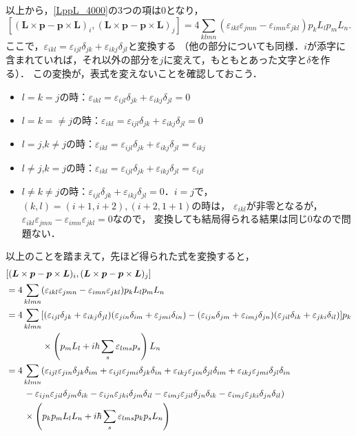 以上から，\eqref{LppL_4000}の3つの項は$0$となり，
\[[(\boldsymbol{L}\times\boldsymbol{p} - \boldsymbol{p}\times\boldsymbol{L})_i,(\boldsymbol{L}\times\boldsymbol{p} - \boldsymbol{p}\times\boldsymbol{L})_j]=4\sum_{klmn}(\varepsilon_{ikl}\varepsilon_{jmn} - \varepsilon_{imn}\varepsilon_{jkl})p_kL_lp_mL_n.\]
ここで，$\varepsilon_{ikl}=\varepsilon_{ijl}\delta_{jk} + \varepsilon_{ikj}\delta_{jl}$と変換する
（他の部分についても同様．$i$が添字に含まれていれば，それ以外の部分を$j$に変えて，もともとあった文字と$\delta$を作る）．
この変換が，表式を変えないことを確認しておこう．
\begin{itemize}
  \item $l=k=j$の時：$\varepsilon_{ikl}=\varepsilon_{ijl}\delta_{jk} + \varepsilon_{ikj}\delta_{jl}=0$
  \item $l=k=\neq j$の時：$\varepsilon_{ikl}=\varepsilon_{ijl}\delta_{jk} + \varepsilon_{ikj}\delta_{jl}=0$
  \item $l=j$,$k\neq j$の時：$\varepsilon_{ikl}=\varepsilon_{ijl}\delta_{jk} + \varepsilon_{ikj}\delta_{jl}=\varepsilon_{ikj}$
  \item $l\neq j$,$k=j$の時：$\varepsilon_{ikl}=\varepsilon_{ijl}\delta_{jk} + \varepsilon_{ikj}\delta_{jl}=\varepsilon_{ijl}$
  \item $l\neq k\neq j$の時：$\varepsilon_{ijl}\delta_{jk} + \varepsilon_{ikj}\delta_{jl}=0$．$i=j$で，$(k,l)=(i + 1,i + 2),(i + 2,1 + 1)$の時は，
  $\varepsilon_{ikl}$が非零となるが，$\varepsilon_{ikl}\varepsilon_{jmn} - \varepsilon_{imn}\varepsilon_{jkl}=0$なので，
  変換しても結局得られる結果は同じ$0$なので問題ない．
\end{itemize}
以上のことを踏まえて，先ほど得られた式を変換すると，
\begin{align}
  & [(\boldsymbol{L}\times\boldsymbol{p} - \boldsymbol{p}\times\boldsymbol{L})_i,(\boldsymbol{L}\times\boldsymbol{p} - \boldsymbol{p}\times\boldsymbol{L})_j] \\
  & = 4\sum_{klmn}(\varepsilon_{ikl}\varepsilon_{jmn} - \varepsilon_{imn}\varepsilon_{jkl})p_kL_lp_mL_n\notag\\
  & = 4\sum_{klmn}[(\varepsilon_{ijl}\delta_{jk} + \varepsilon_{ikj}\delta_{jl})(\varepsilon_{jin}\delta_{im} + \varepsilon_{jmi}\delta_{in}) - (\varepsilon_{ijn}\delta_{jm} + \varepsilon_{imj}\delta_{jn})(\varepsilon_{jil}\delta_{ik} + \varepsilon_{jki}\delta_{il})]p_k \\
  & \qquad \qquad \times \left(p_mL_l + i\hbar\sum_s\varepsilon_{lms}p_s\right)L_n\notag\\
  & = 4\sum_{klmn}(\varepsilon_{ijl}\varepsilon_{jin}\delta_{jk}\delta_{im} + \varepsilon_{ijl}\varepsilon_{jmi}\delta_{jk}\delta_{in} + \varepsilon_{ikj}\varepsilon_{jin}\delta_{jl}\delta_{im} + \varepsilon_{ikj}\varepsilon_{jmi}\delta_{jl}\delta_{in}\notag\\
  & \qquad - \varepsilon_{ijn}\varepsilon_{jil}\delta_{jm}\delta_{ik} - \varepsilon_{ijn}\varepsilon_{jki}\delta_{jm}\delta_{il} - \varepsilon_{imj}\varepsilon_{jil}\delta_{jn}\delta_{ik} - \varepsilon_{imj}\varepsilon_{jki}\delta_{jn}\delta_{il})\notag\\
  & \qquad \times\left(p_kp_mL_lL_n + i\hbar\sum_s\varepsilon_{lms}p_kp_sL_n\right)\label{LppLLppL}
\end{align}
